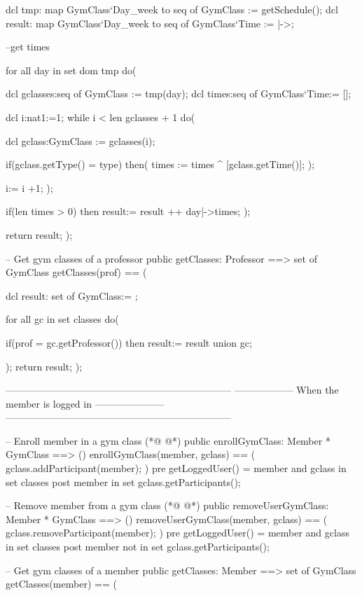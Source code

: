 \begin{vdmpp}[breaklines=true]
  dcl tmp: map GymClass`Day_week to seq of GymClass := getSchedule();
  dcl result: map GymClass`Day_week to seq of GymClass`Time := {|->};
  
  --get times
  
  for all day in set dom tmp do( 
    
    dcl gclasses:seq of GymClass := tmp(day);
    dcl times:seq of GymClass`Time:= [];
    
    dcl i:nat1:=1;
    while i < len gclasses + 1 do(
     
     dcl gclass:GymClass := gclasses(i); 
      
     if(gclass.getType() = type) then(
      times := times ^ [gclass.getTime()];
     );
     
     i:= i +1; 
    );
    
    if(len times > 0) then
    result:= result ++ {day|->times};
  );
   
  return result;
 );
 
 -- Get gym classes of a professor
 public getClasses: Professor ==> set of GymClass
 getClasses(prof) == (
  
  dcl result: set of GymClass:= {};
  
  for all gc in set classes do(
   
   if(prof = gc.getProfessor()) then result:= result union {gc};
    
  );
  return result;
 );
 
  ---------------------------------------------------------------------
  ------------------ When the member is logged in ---------------------
  ---------------------------------------------------------------------
  
 -- Enroll member in a gym class
(*@
\label{enrollGymClass:271}
@*)
 public enrollGymClass: Member * GymClass ==> ()
 enrollGymClass(member, gclass) == ( 
  gclass.addParticipant(member); 
 )
 pre getLoggedUser() = member and gclass in set classes
 post member in set gclass.getParticipants();
 
 
 -- Remove member from a gym class
(*@
\label{removeUserGymClass:280}
@*)
 public removeUserGymClass: Member * GymClass ==> ()
 removeUserGymClass(member, gclass) == (
  gclass.removeParticipant(member);
 )
 pre getLoggedUser() = member and gclass in set classes
 post member not in set gclass.getParticipants();
 

 -- Get gym classes of a member
 public getClasses: Member ==> set of GymClass
 getClasses(member) == (
  

\end{vdmpp}
